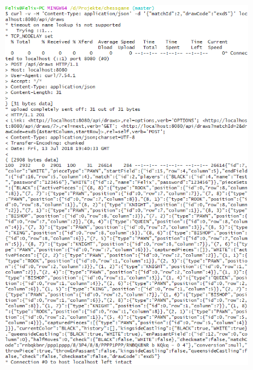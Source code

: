 \begin{enumerate}
\begin{itemize}
				\includegraphics[width=0.8\textwidth]{images/question8.3.png}
		\end{itemize}
\end{enumerate}